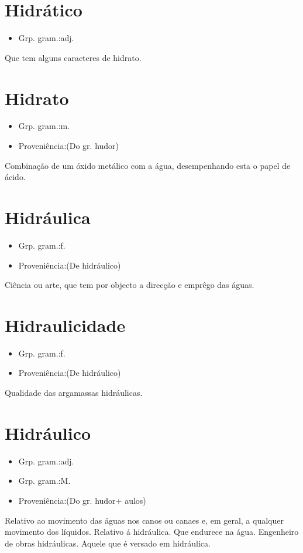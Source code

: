 \documentclass{article}
\begin{document}
\section{Hidrático}
\begin{itemize}
\item {Grp. gram.:adj.}
\end{itemize}
Que tem alguns caracteres de hidrato.
\section{Hidrato}
\begin{itemize}
\item {Grp. gram.:m.}
\end{itemize}
\begin{itemize}
\item {Proveniência:(Do gr. \textunderscore hudor\textunderscore )}
\end{itemize}
Combinação de um óxido metálico com a água, desempenhando esta o papel de ácido.
\section{Hidráulica}
\begin{itemize}
\item {Grp. gram.:f.}
\end{itemize}
\begin{itemize}
\item {Proveniência:(De \textunderscore hidráulico\textunderscore )}
\end{itemize}
Ciência ou arte, que tem por objecto a direcção e emprêgo das águas.
\section{Hidraulicidade}
\begin{itemize}
\item {Grp. gram.:f.}
\end{itemize}
\begin{itemize}
\item {Proveniência:(De \textunderscore hidráulico\textunderscore )}
\end{itemize}
Qualidade das argamassas hidráulicas.
\section{Hidráulico}
\begin{itemize}
\item {Grp. gram.:adj.}
\end{itemize}
\begin{itemize}
\item {Grp. gram.:M.}
\end{itemize}
\begin{itemize}
\item {Proveniência:(Do gr. \textunderscore hudor\textunderscore  + \textunderscore aulos\textunderscore )}
\end{itemize}
Relativo ao movimento das águas nos canos ou canaes e, em geral, a qualquer movimento dos líquidos.
Relativo á hidráulica.
Que endurece na água.
Engenheiro de obras hidráulicas.
Aquele que é versado em hidráulica.
\end{document}

